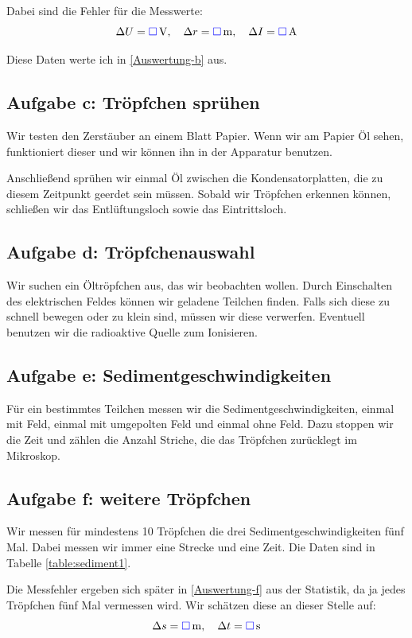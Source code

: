 \documentclass[11pt]{article}
\newcommand{\messwert}{\textcolor{blue}{\square}}
\begin{document}
Dabei sind die Fehler für die Messwerte:
\[
	\Delta U = \unit[\messwert] V,
	\quad
	\Delta r = \unit[\messwert] m,
	\quad
	\Delta I = \unit[\messwert] A
\]

Diese Daten werte ich in \ref{Auswertung-b} aus.

\subsection{Aufgabe c: Tröpfchen sprühen}

Wir testen den Zerstäuber an einem Blatt Papier. Wenn wir am Papier Öl sehen,
funktioniert dieser und wir können ihn in der Apparatur benutzen.

Anschließend sprühen wir einmal Öl zwischen die Kondensatorplatten, die zu
diesem Zeitpunkt geerdet sein müssen. Sobald wir Tröpfchen erkennen können,
schließen wir das Entlüftungsloch sowie das Eintrittsloch.

\subsection{Aufgabe d: Tröpfchenauswahl}

Wir suchen ein Öltröpfchen aus, das wir beobachten wollen. Durch Einschalten
des elektrischen Feldes können wir geladene Teilchen finden. Falls sich diese
zu schnell bewegen oder zu klein sind, müssen wir diese verwerfen. Eventuell
benutzen wir die radioaktive Quelle zum Ionisieren.

\subsection{Aufgabe e: Sedimentgeschwindigkeiten}

Für ein bestimmtes Teilchen messen wir die Sedimentgeschwindigkeiten, einmal
mit Feld, einmal mit umgepolten Feld und einmal ohne Feld. Dazu stoppen wir die
Zeit und zählen die Anzahl Striche, die das Tröpfchen zurücklegt im Mikroskop.

\subsection{Aufgabe f: weitere Tröpfchen}

Wir messen für mindestens 10 Tröpfchen die drei Sedimentgeschwindigkeiten fünf
Mal. Dabei messen wir immer eine Strecke und eine Zeit. Die Daten sind in
Tabelle \ref{table:sediment1}.

Die Messfehler ergeben sich später in \ref{Auswertung-f} aus der Statistik, da
ja jedes Tröpfchen fünf Mal vermessen wird. Wir schätzen diese an dieser Stelle
auf:
\[
	\Delta s = \unit[\messwert] m
	, \quad
	\Delta t = \unit[\messwert] s
\]
\end{document}
